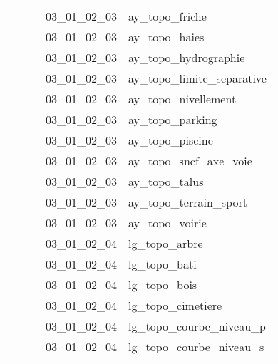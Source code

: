 \documentclass[12pt,titlepage,oneside]{book}
\begin{document}
\begin{supertabular}{|p{7.5cm}|p{7.5cm}|p{7.5cm}|c|p{10cm}|}
                   &                    &                    & 03\_01\_02\_03 & ay\_topo\_friche\\
                   &                    &                    & 03\_01\_02\_03 & ay\_topo\_haies\\
                   &                    &                    & 03\_01\_02\_03 & ay\_topo\_hydrographie\\
                   &                    &                    & 03\_01\_02\_03 & ay\_topo\_limite\_separative\\
                   &                    &                    & 03\_01\_02\_03 & ay\_topo\_nivellement\\
                   &                    &                    & 03\_01\_02\_03 & ay\_topo\_parking\\
                   &                    &                    & 03\_01\_02\_03 & ay\_topo\_piscine\\
                   &                    &                    & 03\_01\_02\_03 & ay\_topo\_sncf\_axe\_voie\\
                   &                    &                    & 03\_01\_02\_03 & ay\_topo\_talus\\
                   &                    &                    & 03\_01\_02\_03 & ay\_topo\_terrain\_sport\\
                   &                    &                    & 03\_01\_02\_03 & ay\_topo\_voirie\\
                   &                    &                    & 03\_01\_02\_04 & lg\_topo\_arbre\\
                   &                    &                    & 03\_01\_02\_04 & lg\_topo\_bati\\
                   &                    &                    & 03\_01\_02\_04 & lg\_topo\_bois\\
                   &                    &                    & 03\_01\_02\_04 & lg\_topo\_cimetiere\\
                   &                    &                    & 03\_01\_02\_04 & lg\_topo\_courbe\_niveau\_p\\
                   &                    &                    & 03\_01\_02\_04 & lg\_topo\_courbe\_niveau\_s\\

\end{supertabular}
\end{document}
